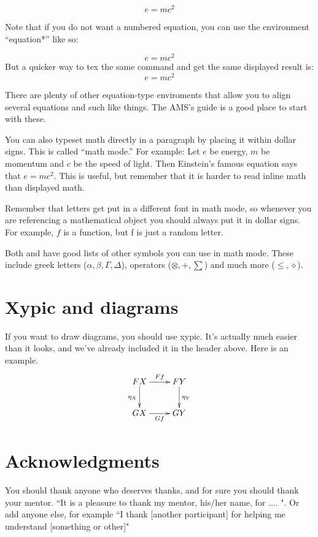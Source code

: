 \documentclass[psamsfonts]{amsart}
\theoremstyle{definition}
\theoremstyle{remark}
\numberwithin{equation}{section}
\begin{document}
\begin{equation}  e = mc^2
\end{equation}

Note that if you do not want a numbered equation, you can use the
environment ``equation*''
 like so:

\begin{equation*}
e=mc^2
\end{equation*}
But a quicker way to tex the same command and get the same displayed result is:
\[  e=mc^2 \]

There are plenty of other equation-type enviroments that allow you to
align several equations and such like things. The AMS's guide \cite{amsshort} is a
good place to start with these.

You can also typeset math directly in a paragraph by placing it within
dollar signs.  This is called ``math mode.''  For example: Let $e$
be energy, $m$ be momentum and $c$ be the speed of light.  Then
Einstein's famous equation says that $e=mc^2$.  This is useful, but
remember that it is harder to read inline math than displayed math. 

Remember that letters get put in a different font in math mode, so
whenever you are referencing a mathematical object you should always
put it in dollar signs.  For example, $f$ is a function, but f is just
a random letter.

Both \cite{notsoshort} and \cite{amsshort} have good lists of other symbols you can use in math mode.
These include greek letters ($\alpha, \beta, \Gamma, \Delta$),
operators ($\otimes, +, \sum$) and much more ($\leq, \diamond$).

\section{Xypic and diagrams}

If you want to draw diagrams, you should use xypic.  It's actually
much easier than it looks, and we've already included it in the header
above.  Here is an example. 
\[\xymatrix{
FX \ar[r]^-{Ff} \ar[d]_{\eta_X} & FY \ar[d]^{\eta_Y} \\
GX \ar[r]_-{Gf} & GY\\} \]

\section*{Acknowledgments}  You should thank anyone who deserves thanks, and for sure you should
thank your mentor.   ``It is a pleasure to thank my mentor, 
his/her name, for ....  ".   Or add anyone else, for example ``I thank [another participant] for helping 
me understand [something or other]"
\end{document}
